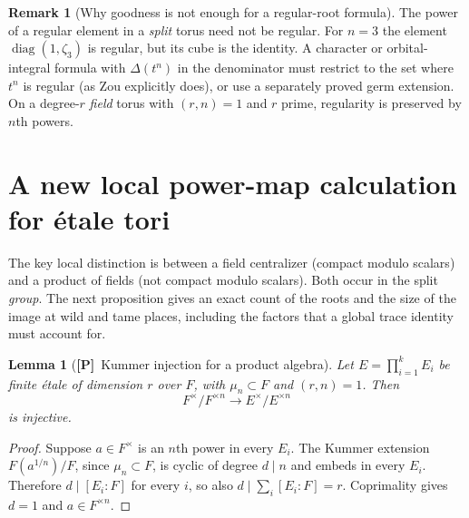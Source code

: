 \documentclass[11pt]{article}
\newcommand{\Ptag}{\textnormal{\textbf{[P]}}}
\theoremstyle{plain}
\newtheorem{lemma}[theorem]{Lemma}
\theoremstyle{definition}
\newtheorem{remark}[theorem]{Remark}
\begin{document}
\begin{remark}[Why goodness is not enough for a regular-root formula]\label{rem:power-singular}
The power of a regular element in a \emph{split} torus need not be
regular.  For $n=3$ the element
$\operatorname{diag}(1,\zeta_3)$ is regular, but its cube is the
identity.  A character or orbital-integral formula with
$\Delta(t^n)$ in the denominator must restrict to the set where
$t^n$ is regular (as Zou explicitly does), or use a separately
proved germ extension.  On a degree-$r$ \emph{field} torus with
$(r,n)=1$ and $r$ prime, regularity is preserved by $n$th powers.
\end{remark}

\section{A new local power-map calculation for \texorpdfstring{\'etale}{etale} tori}\label{sec:localpowers}
The key local distinction is between a field centralizer (compact
modulo scalars) and a product of fields (not compact modulo scalars).
Both occur in the split \emph{group}.  The next proposition gives
an exact count of the roots and the size of the image at wild and
tame places, including the factors that a global trace identity
must account for.

\begin{lemma}[\Ptag\ Kummer injection for a product algebra]\label{lem:Kumprod}
Let $E=\prod_{i=1}^kE_i$ be finite \emph{\'etale} of dimension $r$
over $F$, with $\mu_n\subset F$ and $(r,n)=1$.  Then
\begin{equation}\label{eq:Kummerinj}
 F^\times/F^{\times n}\longrightarrow
 E^\times/E^{\times n}
\end{equation}
is injective.
\end{lemma}
\begin{proof}
Suppose $a\in F^\times$ is an $n$th power in every $E_i$.
The Kummer extension $F(a^{1/n})/F$, since $\mu_n\subset F$,
is cyclic of degree $d\mid n$ and embeds in every $E_i$.
Therefore $d\mid[E_i:F]$ for every $i$, so also
$d\mid\sum_i[E_i:F]=r$.  Coprimality gives $d=1$ and
$a\in F^{\times n}$.
\end{proof}
\end{document}
